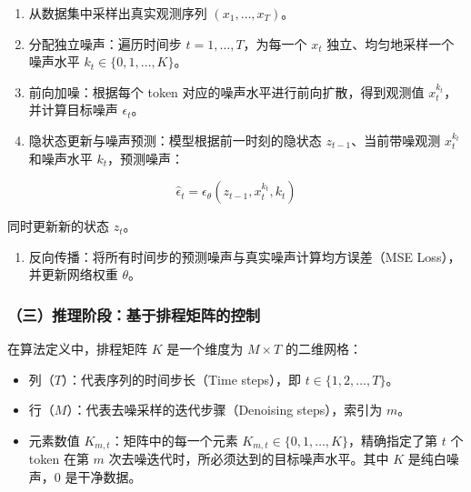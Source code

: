 \begin{enumerate}
\def\labelenumi{\arabic{enumi}.}
\tightlist
\item
  从数据集中采样出真实观测序列 \((x_1,\ldots,x_T)\)。
\item
  分配独立噪声：遍历时间步 \(t=1,\ldots,T\)，为每一个 \(x_t\) 独立、均匀地采样一个噪声水平 \(k_t\in\{0,1,\ldots,K\}\)。
\item
  前向加噪：根据每个 token 对应的噪声水平进行前向扩散，得到观测值 \(x_t^{k_t}\)，并计算目标噪声 \(\epsilon_t\)。
\item
{}
  隐状态更新与噪声预测：模型根据前一时刻的隐状态 \(z_{t-1}\)、当前带噪观测 \(x_t^{k_t}\) 和噪声水平 \(k_t\)，预测噪声：
\end{enumerate}

\[
\hat{\epsilon}_t=\epsilon_\theta(z_{t-1},x_t^{k_t},k_t)
\]

同时更新新的状态 \(z_t\)。

\begin{enumerate}
\def\labelenumi{\arabic{enumi}.}
\setcounter{enumi}{4}
\tightlist
\item
  反向传播：将所有时间步的预测噪声与真实噪声计算均方误差（MSE Loss），并更新网络权重 \(\theta\)。
\end{enumerate}

\hypertarget{ux4e09ux63a8ux7406ux9636ux6bb5ux57faux4e8eux6392ux7a0bux77e9ux9635ux7684ux63a7ux5236}{%
\subsubsection{（三）推理阶段：基于排程矩阵的控制}\label{ux4e09ux63a8ux7406ux9636ux6bb5ux57faux4e8eux6392ux7a0bux77e9ux9635ux7684ux63a7ux5236}}

在算法定义中，排程矩阵 \(K\) 是一个维度为 \(M\times T\) 的二维网格：

\begin{itemize}
\tightlist
\item
  列（\(T\)）：代表序列的时间步长（Time steps），即 \(t\in\{1,2,\ldots,T\}\)。
\item
  行（\(M\)）：代表去噪采样的迭代步骤（Denoising steps），索引为 \(m\)。
\item
  元素数值 \(K_{m,t}\)：矩阵中的每一个元素 \(K_{m,t}\in\{0,1,\ldots,K\}\)，精确指定了第 \(t\) 个 token 在第 \(m\) 次去噪迭代时，所必须达到的目标噪声水平。其中 \(K\) 是纯白噪声，\(0\) 是干净数据。
\end{itemize}

